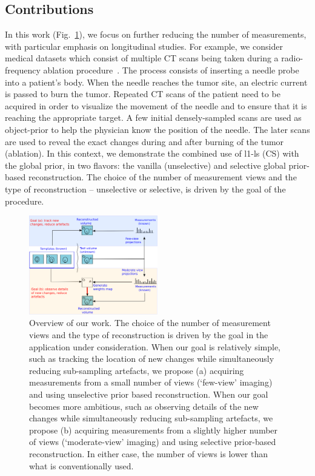\documentclass[journal]{IEEEtran}
\begin{document}
\subsection{\textbf{Contributions}}
\label{sec:contributions}
In this work (Fig.~\ref{fig:prior_overview}), we focus on further reducing the number of measurements, with  particular emphasis on longitudinal studies. For example, we consider medical datasets which consist of multiple CT scans being taken during a radio-frequency ablation procedure~\cite{Dong2015}. The process consists of inserting a needle probe into a patient's body. When the needle reaches the tumor site, an electric current is passed to burn the tumor. Repeated CT scans of the patient need to be acquired in order to visualize the movement of the needle and to ensure that it is reaching the appropriate target. A few initial densely-sampled scans are used as object-prior to help the physician know the position of the needle. The later scans are used to reveal the exact changes during and after burning of the tumor (ablation).  In this context, we demonstrate the combined use of l1-ls (CS) with the global prior, in two flavors: the vanilla (unselective) and selective global prior-based reconstruction. The choice of the number of measurement views and the type of reconstruction -- unselective or selective, is driven by the goal of the procedure. 

\begin{figure}[h]
\centering
	\includegraphics[width=0.5\textwidth]{../images/prior_cmb.png}
        \caption{Overview of our work. The choice of the number of measurement views and the type of reconstruction is driven by the goal in the application under consideration.  When our goal is relatively simple, such as tracking the location of new changes while simultaneously reducing sub-sampling artefacts, we propose (a) acquiring measurements from a small number of views (`few-view' imaging) and using unselective prior based reconstruction. When our goal becomes more ambitious, such as observing details of the new changes while simultaneously reducing sub-sampling artefacts, we propose (b) acquiring measurements from a slightly higher number of views (`moderate-view' imaging) and using selective prior-based reconstruction. In either case, the number of views is lower than what is conventionally used.}
 \label{fig:prior_overview}
\end{figure}
\end{document}
